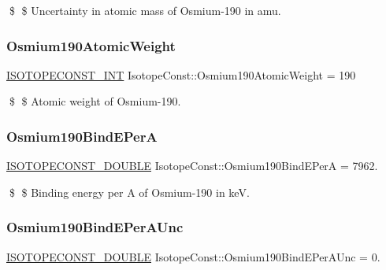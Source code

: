 \$ \$ Uncertainty in atomic mass of Osmium-\/190 in amu. \mbox{\label{group___isotope_const-_osmium-_os190_gab2082f354cb80babbae939e8fd2b0070}} 
\subsubsection{\texorpdfstring{Osmium190\+Atomic\+Weight}{Osmium190AtomicWeight}}
{\footnotesize\ttfamily \mbox{\hyperlink{group___isotope_const-_macros_ga5f18360b3e99483a35c32d789e62621c}{I\+S\+O\+T\+O\+P\+E\+C\+O\+N\+S\+T\+\_\+\+I\+NT}} Isotope\+Const\+::\+Osmium190\+Atomic\+Weight = 190}

\$ \$ Atomic weight of Osmium-\/190. \mbox{\label{group___isotope_const-_osmium-_os190_gafe05480f17b3183e9dd2aabd1d20bbc9}} 
\subsubsection{\texorpdfstring{Osmium190\+Bind\+E\+PerA}{Osmium190BindEPerA}}
{\footnotesize\ttfamily \mbox{\hyperlink{group___isotope_const-_macros_ga8f45a7272ce02c0b4c65c44636ed719a}{I\+S\+O\+T\+O\+P\+E\+C\+O\+N\+S\+T\+\_\+\+D\+O\+U\+B\+LE}} Isotope\+Const\+::\+Osmium190\+Bind\+E\+PerA = 7962.}

\$ \$ Binding energy per A of Osmium-\/190 in keV. \mbox{\label{group___isotope_const-_osmium-_os190_gac5265ce364612d06db96098ddb02d55e}} 
\subsubsection{\texorpdfstring{Osmium190\+Bind\+E\+Per\+A\+Unc}{Osmium190BindEPerAUnc}}
{\footnotesize\ttfamily \mbox{\hyperlink{group___isotope_const-_macros_ga8f45a7272ce02c0b4c65c44636ed719a}{I\+S\+O\+T\+O\+P\+E\+C\+O\+N\+S\+T\+\_\+\+D\+O\+U\+B\+LE}} Isotope\+Const\+::\+Osmium190\+Bind\+E\+Per\+A\+Unc = 0.}

